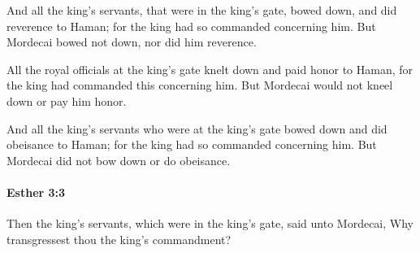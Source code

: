 			\begin{versebox}
					\item[BHS] 
					\item[LXX] 
					\item[ASV] And all the king's servants, that were in the king's gate, bowed down, and did reverence to Haman; for the king had so commanded concerning him. But Mordecai bowed not down, nor did him reverence.
					\item[NIV] All the royal officials at the king’s gate knelt down and paid honor to Haman, for the king had commanded this concerning him. But Mordecai would not kneel down or pay him honor.
					\item[NRSV] And all the king’s servants who were at the king’s gate bowed down and did obeisance to Haman; for the king had so commanded concerning him. But Mordecai did not bow down or do obeisance.
			\end{versebox}

		\paragraph{Esther 3:3} %
			\label{ESTHER-3-3}

			Then the king’s servants, which were in the king’s gate, said unto Mordecai, Why transgressest thou the king’s commandment?

